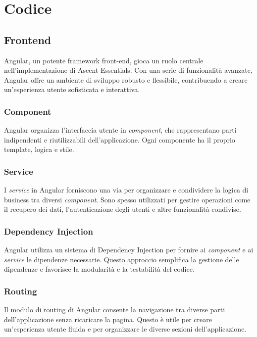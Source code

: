 
\chapter{Codice}

\section{Frontend}

Angular, un potente framework front-end, gioca un ruolo centrale nell'implementazione di Ascent Essentials. Con una serie di funzionalità avanzate, Angular offre un ambiente di sviluppo robusto e flessibile, contribuendo a creare un'esperienza utente sofisticata e interattiva.

\subsection{Component}

Angular organizza l'interfaccia utente in \textit{component}, che rappresentano parti indipendenti e riutilizzabili dell'applicazione. Ogni componente ha il proprio template, logica e stile.

\subsection{Service}

I \textit{service} in Angular forniscono una via per organizzare e condividere la logica di business tra diversi \textit{component}. Sono spesso utilizzati per gestire operazioni come il recupero dei dati, l'autenticazione degli utenti e altre funzionalità condivise.



\subsection{Dependency Injection}
Angular utilizza un sistema di Dependency Injection per fornire ai \textit{component} e ai \textit{service} le dipendenze necessarie. Questo approccio semplifica la gestione delle dipendenze e favorisce la modularità e la testabilità del codice.

\subsection{Routing}
Il modulo di routing di Angular consente la navigazione tra diverse parti dell'applicazione senza ricaricare la pagina. Questo è utile per creare un'esperienza utente fluida e per organizzare le diverse sezioni dell'applicazione.

